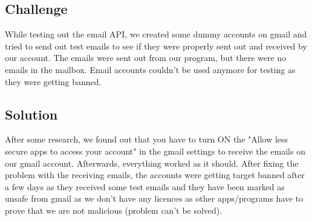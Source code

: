 \subsection{Challenge}
While testing out the email API, we created some dummy accounts on gmail and tried to send out test emails to see if they were properly sent out and received by our account. The emails were sent out from our program, but there were no emails in the mailbox. 
Email accounts couldn't be used anymore for testing as they were getting banned.


\subsection{Solution}
After some research, we found out that you have to turn ON the "Allow less secure apps to access your account" in the gmail settings to receive the emails on our gmail account. Afterwards, everything worked as it should. After fixing the problem with the receiving emails, the accounts were getting target banned after a few days as they received some test emails and they have been marked as unsafe from gmail as we don't have any licences as other apps/programs have to prove that we are not malicious (problem can't be solved).